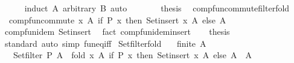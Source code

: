 \begin{isabellebody}
\ \ \ \ \isamarkupfalse%
\ {\isacharparenleft}{\kern0pt}induct\ A\ arbitrary{\isacharcolon}{\kern0pt}\ B{\isacharparenright}{\kern0pt}\ auto\ \ \isanewline
\ \ \isamarkupfalse%
\ \isamarkupfalse%
\ {\isacharquery}{\kern0pt}thesis\ \isacommand{{\isachardot}{\kern0pt}{\isachardot}{\kern0pt}}\isamarkupfalse%
\isanewline
{}\isamarkupfalse%
%
\endisatagproof
{\isafoldproof}%
%
\isadelimproof
\isanewline
%
\endisadelimproof
\isanewline
{}\isamarkupfalse%
\ comp{\isacharunderscore}{\kern0pt}fun{\isacharunderscore}{\kern0pt}commute{\isacharunderscore}{\kern0pt}filter{\isacharunderscore}{\kern0pt}fold{\isacharcolon}{\kern0pt}\isanewline
\ \ {\isachardoublequoteopen}comp{\isacharunderscore}{\kern0pt}fun{\isacharunderscore}{\kern0pt}commute\ {\isacharparenleft}{\kern0pt}{\isasymlambda}x\ A{\isacharprime}{\kern0pt}{\isachardot}{\kern0pt}\ if\ P\ x\ then\ Set{\isachardot}{\kern0pt}insert\ x\ A{\isacharprime}{\kern0pt}\ else\ A{\isacharprime}{\kern0pt}{\isacharparenright}{\kern0pt}{\isachardoublequoteclose}\isanewline
%
\isadelimproof
%
\endisadelimproof
%
\isatagproof
{}\isamarkupfalse%
\ {\isacharminus}{\kern0pt}\isanewline
\ \ \isamarkupfalse%
\ comp{\isacharunderscore}{\kern0pt}fun{\isacharunderscore}{\kern0pt}idem\ Set{\isachardot}{\kern0pt}insert\ \isamarkupfalse%
\ {\isacharparenleft}{\kern0pt}fact\ comp{\isacharunderscore}{\kern0pt}fun{\isacharunderscore}{\kern0pt}idem{\isacharunderscore}{\kern0pt}insert{\isacharparenright}{\kern0pt}\isanewline
\ \ \isamarkupfalse%
\ {\isacharquery}{\kern0pt}thesis\ \isamarkupfalse%
\ standard\ {\isacharparenleft}{\kern0pt}auto\ simp{\isacharcolon}{\kern0pt}\ fun{\isacharunderscore}{\kern0pt}eq{\isacharunderscore}{\kern0pt}iff{\isacharparenright}{\kern0pt}\isanewline
{}\isamarkupfalse%
%
\endisatagproof
{\isafoldproof}%
%
\isadelimproof
\isanewline
%
\endisadelimproof
\isanewline
{}\isamarkupfalse%
\ Set{\isacharunderscore}{\kern0pt}filter{\isacharunderscore}{\kern0pt}fold{\isacharcolon}{\kern0pt}\isanewline
\ \ \ {\isachardoublequoteopen}finite\ A{\isachardoublequoteclose}\isanewline
\ \ \ {\isachardoublequoteopen}Set{\isachardot}{\kern0pt}filter\ P\ A\ {\isacharequal}{\kern0pt}\ fold\ {\isacharparenleft}{\kern0pt}{\isasymlambda}x\ A{\isacharprime}{\kern0pt}{\isachardot}{\kern0pt}\ if\ P\ x\ then\ Set{\isachardot}{\kern0pt}insert\ x\ A{\isacharprime}{\kern0pt}\ else\ A{\isacharprime}{\kern0pt}{\isacharparenright}{\kern0pt}\ {\isacharbraceleft}{\kern0pt}{\isacharbraceright}{\kern0pt}\ A{\isachardoublequoteclose}\isanewline

\end{isabellebody}
